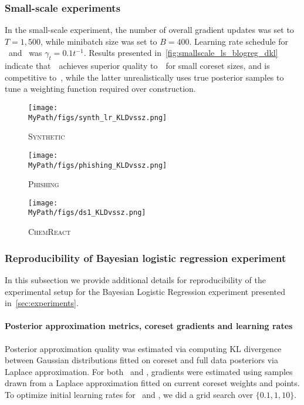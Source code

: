 \subsubsection{Small-scale experiments}
\label{app:small_scale_appendix}

In the small-scale experiment, the number of overall gradient updates was
set to $T = 1,500$, while minibatch size was set to  $B = 400$. Learning rate schedule for \sparsevi~and \psvi~was ${\gamma_t = 0.1t^{-1}}$. Results presented in~\cref{fig:smallscale_ls_blogreg_dkl} indicate that~\psvi~achieves superior quality to~\sparsevi~for small coreset sizes, and is competitive to~\gigao, while the latter unrealistically uses true posterior samples to tune a weighting function required over construction.

\begin{figure*}[!tp]
	\centering
	\begin{subfigure}[]{.29\textwidth}
		\caption*{\textsc{Synthetic}}
		\centerline{\texttt{[image: \\MyPath/figs/synth\_lr\_KLDvssz.png]}}%
	\end{subfigure}\hfill\qquad
	\centering
	\begin{subfigure}[]{.29\textwidth}
		\caption*{\textsc{Phishing}}
		\centerline{\texttt{[image: \\MyPath/figs/phishing\_KLDvssz.png]}}%
	\end{subfigure}\hfill\qquad
	\centering
	\begin{subfigure}[]{.29\textwidth}
		\caption*{\textsc{ChemReact}}
		\centerline{\texttt{[image: \\MyPath/figs/ds1\_KLDvssz.png]}}%
	\end{subfigure}
	\caption{Comparison of (pseudo)coreset approximate posterior
		quality vs  coreset
		size for logistic regression over 10 trials.}
	\label{fig:smallscale_ls_blogreg_dkl}
\end{figure*}

\subsubsection{Reproducibility of Bayesian logistic regression experiment}
\label{app:reproducibility}
In this subsection we provide additional details for reproducibility of the experimental setup for the Bayesian Logistic Regression experiment presented in~\cref{sec:experiments}.  

\paragraph{Posterior approximation metrics, coreset gradients and learning rates} 
Posterior approximation quality was estimated via computing KL divergence between Gaussian distributions fitted on coreset and full data posteriors via Laplace approximation. For both \sparsevi~and \psvi, gradients were estimated using samples drawn from a Laplace approximation fitted on current coreset weights
and points. To optimize initial learning rates for \sparsevi~and \psvi, we did a grid search over ${\{0.1, 1, 10\}}$.

